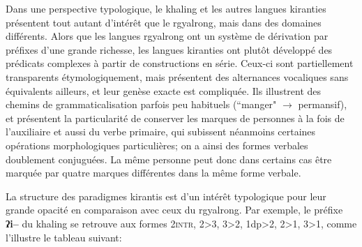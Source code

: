 \documentclass[oldfontcommands,oneside,a4paper,11pt]{memoir}
\newcommand{\ipa}[1]{{\phon\textbf{#1}}}
\begin{document}
Dans une perspective typologique, le khaling et les autres langues kiranties présentent tout autant d'intérêt que le rgyalrong, mais dans des domaines différents. Alors que les langues rgyalrong ont un système de dérivation par préfixes  d'une grande richesse, les langues kiranties ont plutôt développé des prédicats complexes à partir de constructions en série. Ceux-ci sont partiellement transparents étymologiquement, mais présentent des alternances vocaliques sans équivalents ailleurs, et leur genèse exacte est compliquée. Ils illustrent des chemins de grammaticalisation parfois peu habituels (``manger" $\rightarrow$ permansif), et présentent la particularité de conserver les marques de personnes à la fois de l'auxiliaire et aussi du verbe primaire, qui subissent néanmoins certaines opérations morphologiques particulières; on a ainsi des formes verbales doublement conjuguées. La même personne peut donc dans certains cas être marquée par quatre marques différentes dans la même forme verbale.


La structure des paradigmes kirantis est d'un intérêt typologique pour leur grande opacité en comparaison avec ceux du rgyalrong. Par exemple, le préfixe \ipa{ʔi--} du khaling se retrouve aux formes \textsc{2intr}, 2>3, 3>2, 1dp>2, 2>1, 3>1, comme l'illustre le tableau suivant:
\end{document}
